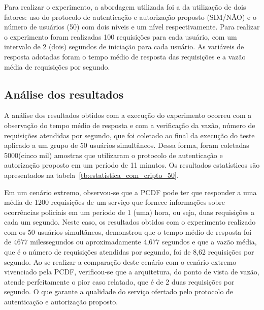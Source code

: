 Para realizar o experimento, a abordagem utilizada foi a da utilização de dois fatores: uso do protocolo de autenticação e autorização proposto (SIM/NÃO) e o número de usuários (50) com dois níveis e um nível respectivamente.  Para realizar o experimento foram realizadas 100 requisições para cada usuário, com um intervalo de 2 (dois) segundos de iniciação para cada usuário. As variáveis de resposta adotadas foram o tempo médio de resposta das requisições e a vazão média de requisições por segundo.

\subsection{Análise dos resultados}

A análise dos resultados obtidos com a execução do experimento ocorreu com a observação do tempo médio de resposta e com a verificação da vazão, número de requisições atendidas por segundo, que foi coletado ao final da execução do teste aplicado a um grupo de 50 usuários simultâneos. Dessa forma, foram coletadas 5000(cinco mil) amostras que utilizaram o protocolo de autenticação e autorização proposto em um período de 11 minutos. Os resultados estatísticos são apresentados na tabela~\ref{tb:estatistica_com_cripto_50}.

Em um cenário extremo, observou-se que a PCDF pode ter que responder a uma média de 1200 requisições de um serviço que fornece informações sobre ocorrências policiais em um período de 1 (uma) hora, ou seja, duas requisições a cada um segundo. Neste caso, os resultados obtidos com o experimento realizado com os 50 usuários simultâneos, demonstrou que o tempo médio de resposta foi de 4677 milessegundos ou aproximadamente 4,677 segundos e que a vazão média, que é o número de requisições atendidas por segundo, foi de 8,62 requisições por segundo. Ao se realizar a comparação deste cenário com o cenário extremo vivenciado pela PCDF, verificou-se que a arquitetura, do ponto de vista de vazão, atende perfeitamente o pior caso relatado, que é de 2 duas requisições por segundo. O que garante a qualidade do serviço ofertado pelo protocolo de autenticação e autorização proposto.

